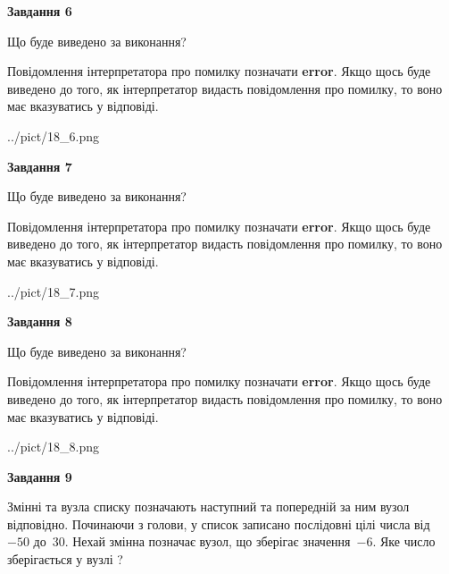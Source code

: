 \documentclass[12pt, ukrainian]{article}
\begin{document}
{\begin {large}
{\begin {center}\textbf{Завдання 6}\end {center}}\par
Що буде виведено за виконання?

Повідомлення інтерпретатора про помилку позначати \textbf{error}.
Якщо щось буде виведено до того, як інтерпретатор видасть повідомлення про помилку, 
то воно має вказуватись у відповіді. \par


\begin{center}
	{../pict/18_6.png}
\end{center}
\newpage

{\begin {center}\textbf{Завдання 7}\end {center}}\par
Що буде виведено за виконання?

Повідомлення інтерпретатора про помилку позначати \textbf{error}.
Якщо щось буде виведено до того, як інтерпретатор видасть повідомлення про помилку, 
то воно має вказуватись у відповіді. \par


\begin{center}
	{../pict/18_7.png}
\end{center}
\newpage

{\begin {center}\textbf{Завдання 8}\end {center}}\par
Що буде виведено за виконання?

Повідомлення інтерпретатора про помилку позначати \textbf{error}.
Якщо щось буде виведено до того, як інтерпретатор видасть повідомлення про помилку, 
то воно має вказуватись у відповіді. \par


\begin{center}
	{../pict/18_8.png}
\end{center}
\newpage

{\begin {center}\textbf{Завдання 9}\end {center}}\par
Змінні  та  вузла списку позначають наступний та попередній за ним вузол відповідно. Починаючи з голови, у список записано послідовні цілі числа від~$-50$ до~$30$. Нехай змінна  позначає вузол, що зберігає значення~$-6$.
Яке число зберігається у вузлі  ?\par
\newpage


\end{large}}
\end{document}
